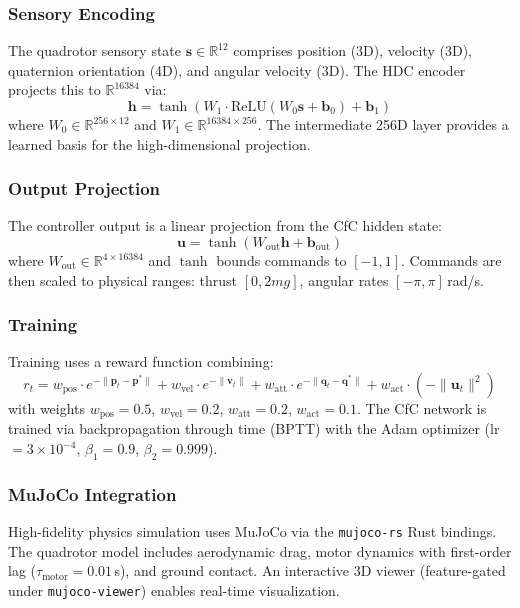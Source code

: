 \documentclass[11pt,a4paper]{article}
\begin{document}
\subsubsection{Sensory Encoding}

The quadrotor sensory state $\mathbf{s} \in \mathbb{R}^{12}$ comprises position (3D), velocity (3D), quaternion orientation (4D), and angular velocity (3D).
The HDC encoder projects this to $\mathbb{R}^{16384}$ via:
\[
\mathbf{h} = \tanh\left(W_1 \cdot \text{ReLU}(W_0 \mathbf{s} + \mathbf{b}_0) + \mathbf{b}_1\right)
\]
where $W_0 \in \mathbb{R}^{256 \times 12}$ and $W_1 \in \mathbb{R}^{16384 \times 256}$.
The intermediate 256D layer provides a learned basis for the high-dimensional projection.

\subsubsection{Output Projection}

The controller output is a linear projection from the CfC hidden state:
\[
\mathbf{u} = \tanh(W_{\text{out}} \mathbf{h} + \mathbf{b}_{\text{out}})
\]
where $W_{\text{out}} \in \mathbb{R}^{4 \times 16384}$ and $\tanh$ bounds commands to $[-1, 1]$.
Commands are then scaled to physical ranges: thrust $[0, 2mg]$, angular rates $[-\pi, \pi]$\,rad/s.

\subsubsection{Training}

Training uses a reward function combining:
\[
r_t = w_{\text{pos}} \cdot e^{-\|\mathbf{p}_t - \mathbf{p}^*\|} + w_{\text{vel}} \cdot e^{-\|\mathbf{v}_t\|} + w_{\text{att}} \cdot e^{-\|\mathbf{q}_t - \mathbf{q}^*\|} + w_{\text{act}} \cdot (-\|\mathbf{u}_t\|^2)
\]
with weights $w_{\text{pos}} = 0.5$, $w_{\text{vel}} = 0.2$, $w_{\text{att}} = 0.2$, $w_{\text{act}} = 0.1$.
The CfC network is trained via backpropagation through time (BPTT) with the Adam optimizer (lr $= 3 \times 10^{-4}$, $\beta_1 = 0.9$, $\beta_2 = 0.999$).

\subsubsection{MuJoCo Integration}

High-fidelity physics simulation uses MuJoCo \citep{todorov2012mujoco} via the \texttt{mujoco-rs} Rust bindings.
The quadrotor model includes aerodynamic drag, motor dynamics with first-order lag ($\tau_{\text{motor}} = 0.01$\,s), and ground contact.
An interactive 3D viewer (feature-gated under \texttt{mujoco-viewer}) enables real-time visualization.
\end{document}
